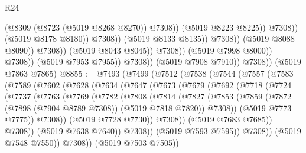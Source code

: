 \begin{lexlean}{R24}
\begin{coremodule}
                                                      (@8309 (@8723 (@5019 @8268 @8270)) @7308))
                                                    (@5019 @8223 @8225))
                                                  @7308))
                                              (@5019 @8178 @8180))
                                            @7308))
                                        (@5019 @8133 @8135))
                                      @7308))
                                  (@5019 @8088 @8090))
                                @7308))
                            (@5019 @8043 @8045))
                          @7308))
                      (@5019 @7998 @8000))
                    @7308))
                (@5019 @7953 @7955))
              @7308))
          (@5019 @7908 @7910))
        @7308))
    (@5019 @7863 @7865)
@8855 := @7493
    (@7499
      (@7512
        (@7538
          (@7544
            (@7557
              (@7583
                (@7589
                  (@7602
                    (@7628
                      (@7634
                        (@7647
                          (@7673
                            (@7679
                              (@7692
                                (@7718
                                  (@7724
                                    (@7737
                                      (@7763
                                        (@7769
                                          (@7782
                                            (@7808
                                              (@7814
                                                (@7827
                                                  (@7853
                                                    (@7859
                                                      (@7872
                                                        (@7898 (@7904 @8789 @7308))
                                                        (@5019 @7818 @7820))
                                                      @7308))
                                                  (@5019 @7773 @7775))
                                                @7308))
                                            (@5019 @7728 @7730))
                                          @7308))
                                      (@5019 @7683 @7685))
                                    @7308))
                                (@5019 @7638 @7640))
                              @7308))
                          (@5019 @7593 @7595))
                        @7308))
                    (@5019 @7548 @7550))
                  @7308))
              (@5019 @7503 @7505))

\end{coremodule}
\end{lexlean}

